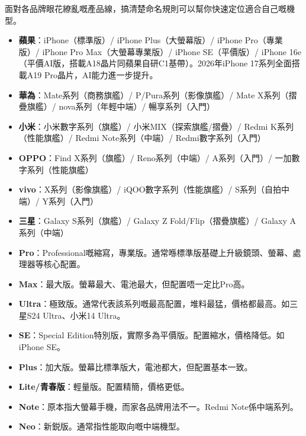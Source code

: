 
面對各品牌眼花繚亂嘅產品線，搞清楚命名規則可以幫你快速定位適合自己嘅機型。


\begin{itemize}
  \item \textbf{蘋果}：iPhone（標準版）/ iPhone Plus（大螢幕版）/ iPhone Pro（專業版）/ iPhone Pro Max（大螢幕專業版）/ iPhone SE（平價版）/ iPhone 16e（平價AI版，搭載A18晶片同蘋果自研C1基帶）。2026年iPhone 17系列全面搭載A19 Pro晶片，AI能力進一步提升。
  \item \textbf{華為}：Mate系列（商務旗艦）/ P/Pura系列（影像旗艦）/ Mate X系列（摺疊旗艦）/ nova系列（年輕中端）/ 暢享系列（入門）
  \item \textbf{小米}：小米數字系列（旗艦）/ 小米MIX（探索旗艦/摺疊）/ Redmi K系列（性能旗艦）/ Redmi Note系列（中端）/ Redmi數字系列（入門）
  \item \textbf{OPPO}：Find X系列（旗艦）/ Reno系列（中端）/ A系列（入門）/ 一加數字系列（性能旗艦）
  \item \textbf{vivo}：X系列（影像旗艦）/ iQOO數字系列（性能旗艦）/ S系列（自拍中端）/ Y系列（入門）
  \item \textbf{三星}：Galaxy S系列（旗艦）/ Galaxy Z Fold/Flip（摺疊旗艦）/ Galaxy A系列（中端）
\end{itemize}


\begin{itemize}
  \item \textbf{Pro}：Professional嘅縮寫，專業版。通常喺標準版基礎上升級鏡頭、螢幕、處理器等核心配置。
  \item \textbf{Max}：最大版。螢幕最大、電池最大，但配置唔一定比Pro高。
  \item \textbf{Ultra}：極致版。通常代表該系列嘅最高配置，堆料最猛，價格都最高。如三星S24 Ultra、小米14 Ultra。
  \item \textbf{SE}：Special Edition特別版，實際多為平價版。配置縮水，價格降低。如iPhone SE。
  \item \textbf{Plus}：加大版。螢幕比標準版大，電池都大，但配置基本一致。
  \item \textbf{Lite/青春版}：輕量版。配置精簡，價格更低。
  \item \textbf{Note}：原本指大螢幕手機，而家各品牌用法不一。Redmi Note係中端系列。
  \item \textbf{Neo}：新鋭版。通常指性能取向嘅中端機型。
\end{itemize}

